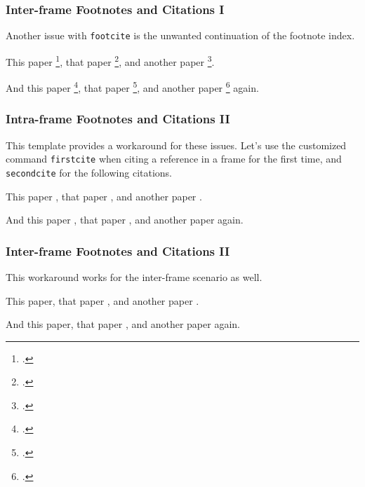 \begin{frame}
    \frametitle{Inter-frame Footnotes and Citations I}

    Another issue with \texttt{footcite} is the unwanted continuation of the footnote index. \newline

    This paper \footcite{Harshman1970}, that paper \footcite{Hitchcock1927}, and another paper \footcite{Carroll1970}. \newline

    And this paper \footcite{Harshman1970}, that paper \footcite{Hitchcock1927}, and another paper \footcite{Carroll1970} again. \newline

\end{frame}

\begin{frame}
    \frametitle{Intra-frame Footnotes and Citations II}
    
    This template provides a workaround for these issues. 
    Let's use the customized command \texttt{firstcite} when citing a reference in a frame for the first time, and \texttt{secondcite} for the following citations. \newline

    This paper , that paper , and another paper . \newline

    And this paper , that paper , and another paper  again. 
\end{frame}

\begin{frame}
    \frametitle{Inter-frame Footnotes and Citations II}

    This workaround works for the inter-frame scenario as well. \newline

    This paper, that paper , and another paper . \newline

    And this paper, that paper , and another paper  again. 
\end{frame}

